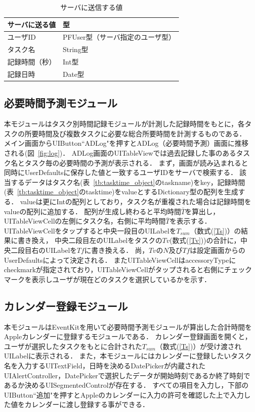 \begin{table}[htb]
\begin{center}
  \begin{tabular}{|l|l|} \hline
    サーバに送る値 & 型 \\ \hline
    ユーザID & PFUser型（サーバ指定のユーザ型） \\
    タスク名 & String型 \\
    記録時間（秒） & Int型 \\
    記録日時 & Date型 \\
	\hline
  \end{tabular}
  \caption{サーバに送信する値}
  \label{tb:serverdata1}
\end{center}
\end{table}

\subsection{必要時間予測モジュール}  
本モジュールはタスク別時間記録モジュールが計測した記録時間をもとに，各タスクの所要時間及び複数タスクに必要な総合所要時間を計測するものである．
メイン画面からUIButton``ADLog"を押すとADLog（必要時間予測）画面に推移される(図~\ref{fig:log})．
ADLog画面のUITableViewでは過去記録した事のあるタスク名とタスク毎の必要時間の予測が表示される．
まず，画面が読み込まれると同時にUserDefaultsに保存した値と一致するユーザIDをサーバで検索する．
該当するデータはタスク名(表~\ref{tb:tasktime_object}のtaskname)をkey，記録時間(表~\ref{tb:tasktime_object}のtasktime)をvalueとするDictionary型の配列を生成する．
valueは更にIntの配列としており，タスク名が重複された場合は記録時間をvalueの配列に追加する．
配列が生成し終わると平均時間$\bar{T}$を算出し，UITableViewCellの左側にタスク名，右側に平均時間$\bar{T}$を表示する．
UITableViewCellをタップすると中央一段目のUILabelを$T_{sum}$（数式(\ref{Ts})）の結果に書き換え，
中央二段目左のUILabelをタスクの$Tv$(数式(\ref{Tv}))の合計に，中央二段目右のUILabelを$Tf$に書き換える．
尚，$Tv$の$N$及び$Tf$は設定画面からのUserDefaultsによって決定される．
またUITableViewCellはaccessoryTypeにcheckmarkが指定されており，UITableViewCellがタップされると右側にチェックマークを表示しユーザが現在どのタスクを選択しているかを示す．

\subsection{カレンダー登録モジュール}
本モジュールはEventKitを用いて必要時間予測モジュールが算出した合計時間をAppleカレンダーに登録するモジュールである．
カレンダー登録画面を開くと，ユーザが選択したタスクをもとに合計された$T_{sum}$（数式(\ref{Ts})）が受け渡されUILabelに表示される．
また，本モジュールにはカレンダーに登録したいタスク名を入力するUITextField，日時を決めるDatePickerが内蔵されたUIAlertController，DatePickerで選択したデータが開始時刻であるか終了時刻であるか決めるUISegmentedControlが存在する．
すべての項目を入力し，下部のUIButton``追加"を押すとAppleのカレンダーに入力の許可を確認した上で入力した値をカレンダーに渡し登録する事ができる．



